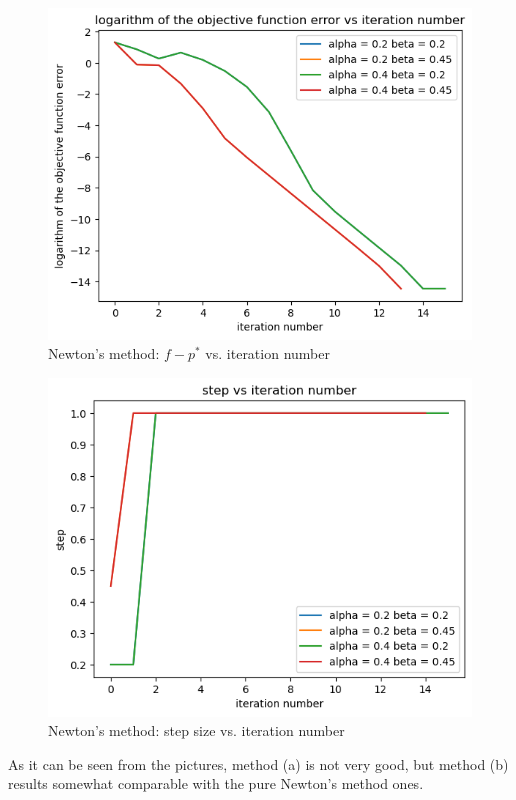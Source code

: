 \documentclass{article}
\begin{document}
\begin{figure}[H]
	\includegraphics[width=\linewidth]{9_31_b_obj_func.png}
	\caption{Newton's method: $f - p^*$ vs. iteration number}
\end{figure}

\begin{figure}[H]
	\includegraphics[width=\linewidth]{9_31_b_step.png}
	\caption{Newton's method: step size vs. iteration number}
\end{figure}


As it can be seen from the pictures, method (a) is not very good, but method (b) results somewhat 
comparable with the pure Newton's method ones.
\end{document}
